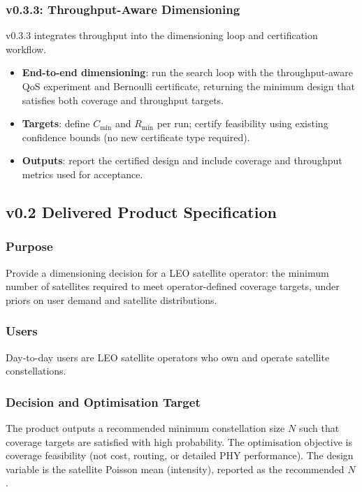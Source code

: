 \documentclass[11pt,a4paper]{article}
\begin{document}
\subsubsection{v0.3.3: Throughput-Aware Dimensioning}
v0.3.3 integrates throughput into the dimensioning loop and certification workflow.
\begin{itemize}
    \item \textbf{End-to-end dimensioning}: run the search loop with the throughput-aware QoS experiment
    and Bernoulli certificate, returning the minimum design that satisfies both coverage and throughput targets.
    \item \textbf{Targets}: define $C_{\min}$ and $R_{\min}$ per run; certify feasibility using existing confidence
    bounds (no new certificate type required).
    \item \textbf{Outputs}: report the certified design and include coverage and throughput metrics used for acceptance.
\end{itemize}

\subsection{v0.2 Delivered Product Specification}
\subsubsection{Purpose}
Provide a dimensioning decision for a LEO satellite operator: the minimum number of satellites required to meet
operator-defined coverage targets, under priors on user demand and satellite distributions.

\subsubsection{Users}
Day-to-day users are LEO satellite operators who own and operate satellite constellations.

\subsubsection{Decision and Optimisation Target}
The product outputs a recommended minimum constellation size $N$ such that coverage targets are satisfied with high
probability. The optimisation objective is coverage feasibility (not cost, routing, or detailed PHY performance).
The design variable is the satellite Poisson mean (intensity), reported as the recommended $N$.
\end{document}
